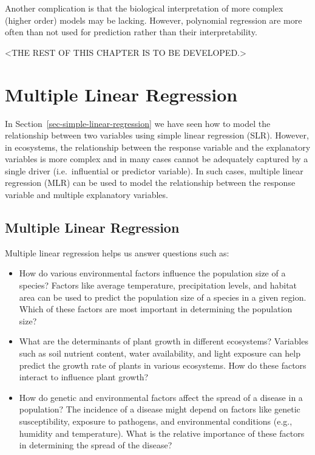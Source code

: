 \documentclass[
  letterpaper,
]{book}
\providecommand{\tightlist}{%
  \setlength{\itemsep}{0pt}\setlength{\parskip}{0pt}}\usepackage{longtable,booktabs,array}
\begin{document}
Another complication is that the biological interpretation of more
complex (higher order) models may be lacking. However, polynomial
regression are more often than not used for prediction rather than their
interpretability.

\textless THE REST OF THIS CHAPTER IS TO BE DEVELOPED.\textgreater{}

\chapter{Multiple Linear
Regression}\label{sec-multiple-linear-regression}

In Section~\ref{sec-simple-linear-regression} we have seen how to model
the relationship between two variables using simple linear regression
(SLR). However, in ecosystems, the relationship between the response
variable and the explanatory variables is more complex and in many cases
cannot be adequately captured by a single driver (i.e.~influential or
predictor variable). In such cases, multiple linear regression (MLR) can
be used to model the relationship between the response variable and
multiple explanatory variables.

\section{Multiple Linear Regression}\label{multiple-linear-regression}

Multiple linear regression helps us answer questions such as:

\begin{itemize}
\tightlist
\item
  How do various environmental factors influence the population size of
  a species? Factors like average temperature, precipitation levels, and
  habitat area can be used to predict the population size of a species
  in a given region. Which of these factors are most important in
  determining the population size?
\item
  What are the determinants of plant growth in different ecosystems?
  Variables such as soil nutrient content, water availability, and light
  exposure can help predict the growth rate of plants in various
  ecosystems. How do these factors interact to influence plant growth?
\item
  How do genetic and environmental factors affect the spread of a
  disease in a population? The incidence of a disease might depend on
  factors like genetic susceptibility, exposure to pathogens, and
  environmental conditions (e.g., humidity and temperature). What is the
  relative importance of these factors in determining the spread of the
  disease?
\end{itemize}
\end{document}
